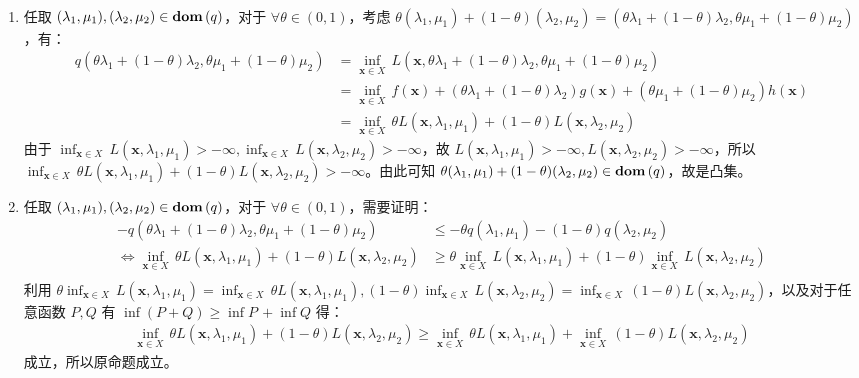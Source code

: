 \documentclass[11pt,letter,notitlepage]{article}
\DeclareMathOperator*{\dom}{\bf dom\,}
\begin{document}
\begin{solution}
	\heiti
	\ \\
	\begin{enumerate}
		\item 任取 $(\lambda_1, \mu_1), (\lambda_2, \mu_2) \in \dom(q)$，对于 $\forall \theta \in (0,1)$，考虑 $\theta(\lambda_1, \mu_1) + (1-\theta)(\lambda_2, \mu_2) = (\theta \lambda_1 + (1-\theta)\lambda_2, \theta \mu_1 + (1-\theta)\mu_2)$，有：
		\begin{align*}
			q(\theta \lambda_1 + (1-\theta)\lambda_2, \theta \mu_1 + (1-\theta)\mu_2) &=\inf_{\mathbf{x}\in X}\,L(\mathbf{x},\theta \lambda_1 + (1-\theta)\lambda_2, \theta \mu_1 + (1-\theta)\mu_2)\\
			&=\inf_{\mathbf{x}\in X}\,f(\mathbf{x})+(\theta \lambda_1 + (1-\theta)\lambda_2)g(\mathbf{x}) + (\theta \mu_1 + (1-\theta)\mu_2)h(\mathbf{x})\\
			&=\inf_{\mathbf{x}\in X}\,\theta L(\mathbf{x},\lambda_1, \mu_1) + (1-\theta)L(\mathbf{x}, \lambda_2, \mu_2)
		\end{align*}
		由于 $\inf_{\mathbf{x}\in X}\,L(\mathbf{x},\lambda_1,\mu_1) > -\infty, \inf_{\mathbf{x}\in X}\,L(\mathbf{x},\lambda_2,\mu_2) > -\infty$，故 $L(\mathbf{x},\lambda_1,\mu_1) > -\infty, L(\mathbf{x},\lambda_2,\mu_2) > -\infty$，所以 $\inf_{\mathbf{x}\in X}\,\theta L(\mathbf{x},\lambda_1, \mu_1) + (1-\theta)L(\mathbf{x}, \lambda_2, \mu_2) > -\infty$。由此可知 $\theta(\lambda_1, \mu_1) + (1-\theta)(\lambda_2, \mu_2) \in \dom(q)$，故是凸集。
		\item 任取 $(\lambda_1, \mu_1), (\lambda_2, \mu_2) \in \dom(q)$，对于 $\forall \theta \in (0,1)$，需要证明：
		\begin{align*}
			-q(\theta \lambda_1 + (1-\theta)\lambda_2, \theta \mu_1 + (1-\theta)\mu_2) &\leqslant -\theta q(\lambda_1,\mu_1) - (1-\theta)q(\lambda_2,\mu_2)\\
			\Leftrightarrow \inf_{\mathbf{x}\in X}\,\theta L(\mathbf{x},\lambda_1, \mu_1) + (1-\theta)L(\mathbf{x}, \lambda_2, \mu_2) &\geqslant \theta \inf_{\mathbf{x}\in X}\,  L(\mathbf{x},\lambda_1, \mu_1) + (1-\theta) \inf_{\mathbf{x}\in X}\, L(\mathbf{x}, \lambda_2, \mu_2)\\
		\end{align*}
		利用 $\theta \inf_{\mathbf{x}\in X}\,  L(\mathbf{x},\lambda_1, \mu_1) = \inf_{\mathbf{x}\in X}\, \theta L(\mathbf{x},\lambda_1, \mu_1), (1-\theta) \inf_{\mathbf{x}\in X}\, L(\mathbf{x}, \lambda_2, \mu_2) =  \inf_{\mathbf{x}\in X}\, (1-\theta) L(\mathbf{x}, \lambda_2, \mu_2)$，以及对于任意函数 $P,Q$ 有 $\inf(P+Q) \geqslant \inf P\,+ \inf Q$ 得：
		\begin{align*}
			\inf_{\mathbf{x}\in X}\,\theta L(\mathbf{x},\lambda_1, \mu_1) + (1-\theta)L(\mathbf{x}, \lambda_2, \mu_2) \geqslant  \inf_{\mathbf{x}\in X}\, \theta L(\mathbf{x},\lambda_1, \mu_1) +  \inf_{\mathbf{x}\in X}\,(1-\theta) L(\mathbf{x}, \lambda_2, \mu_2)
		\end{align*}
		成立，所以原命题成立。
	\end{enumerate}
\end{solution}
\end{document}
